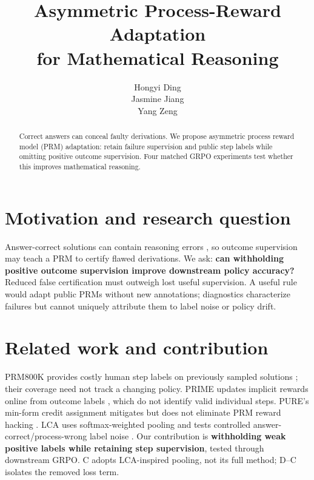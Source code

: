 \documentclass{article}
\title{Asymmetric Process-Reward Adaptation\\for Mathematical Reasoning}
\author{
Hongyi Ding \\
\And
Jasmine Jiang \\
\And
Yang Zeng \\
}
\begin{document}
\maketitle
\begin{abstract}
Correct answers can conceal faulty derivations. We propose asymmetric process reward model (PRM) adaptation: retain failure supervision and public step labels while omitting positive outcome supervision. Four matched GRPO experiments test whether this improves mathematical reasoning.
\end{abstract}

\section{Motivation and research question}
Answer-correct solutions can contain reasoning errors \citep{zheng2025}, so outcome supervision may teach a PRM to certify flawed derivations. We ask: \textbf{can withholding positive outcome supervision improve downstream policy accuracy?} Reduced false certification must outweigh lost useful supervision. A useful rule would adapt public PRMs without new annotations; diagnostics characterize failures but cannot uniquely attribute them to label noise or policy drift.

\section{Related work and contribution}
PRM800K provides costly human step labels on previously sampled solutions \citep{lightman2023}; their coverage need not track a changing policy. PRIME updates implicit rewards online from outcome labels \citep{cui2025}, which do not identify valid individual steps. PURE's min-form credit assignment mitigates but does not eliminate PRM reward hacking \citep{cheng2025}. LCA uses softmax-weighted pooling and tests controlled answer-correct/process-wrong label noise \citep[App.~E.3]{jia2026}. Our contribution is \textbf{withholding weak positive labels while retaining step supervision}, tested through downstream GRPO. C adopts LCA-inspired pooling, not its full method; D--C isolates the removed loss term.
\end{document}
